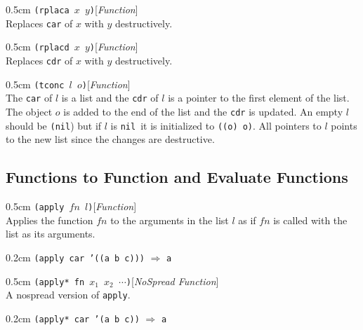 \documentclass[a4paper]{article}
\newcommand{\lisp}[1]{\texttt{#1}}
\newcommand{\NIL}{\lisp{nil}}
\newcommand{\xargs}{$x_{1}$ $x_{2}$ $\cdots$}
\newenvironment{defun}[2]{\begin{adjustwidth}{0.5cm}{}
    {\hspace*{-0.5cm}\lisp{#2}\hfill[\textit{#1}]\\}}
               {\end{adjustwidth}}
\newcommand{\example}[2]{
  \begin{adjustwidth}{0.2cm}{}
    \lisp{#1} $\Rightarrow$ \lisp{#2}
  \end{adjustwidth}
}
\begin{document}
\begin{defun}{Function}{(rplaca $x$ $y$)}
  Replaces \lisp{car} of $x$ with $y$ destructively.
\end{defun}

\begin{defun}{Function}{(rplacd $x$ $y$)}
  Replaces \lisp{cdr} of $x$ with $y$ destructively.
\end{defun}

\begin{defun}{Function}{(tconc $l$ $o$)}
  The \lisp{car} of $l$ is a list and the \lisp{cdr} of $l$ is a
  pointer to the first element of the list.  The object $o$ is added
  to the end of the list and the \lisp{cdr} is updated.  An empty $l$
  should be \lisp{(nil}) but if $l$ is \NIL\ it is initialized to
  \lisp{((o) o)}.  All pointers to $l$ points to the new list since
  the changes are destructive.
\end{defun}

\subsection{Functions to Function and Evaluate Functions}

\begin{defun}{Function}{(apply $fn$ $l$)}
  Applies the function $fn$ to the arguments in the list $l$ as if
  $fn$ is called with the list as its arguments.

  \example{(apply car '((a b c)))}{a}
\end{defun}

\begin{defun}{NoSpread Function}{(apply* fn \xargs)}
  A nospread version of \lisp{apply}.

  \example{(apply* car '(a b c))}{a}
\end{defun}
\end{document}
